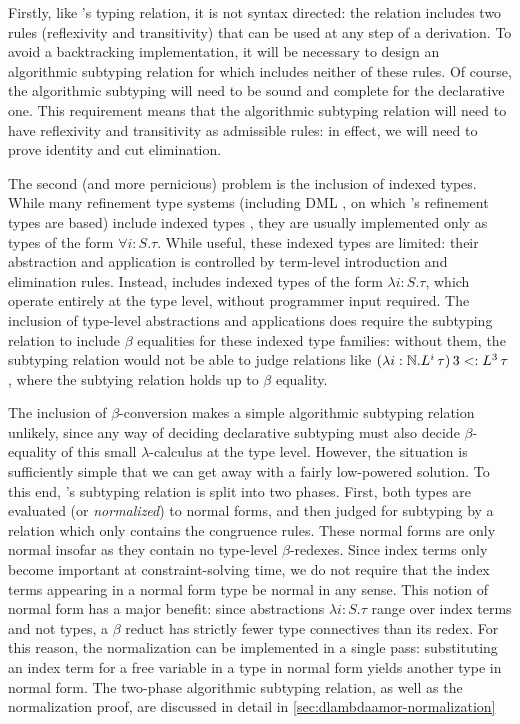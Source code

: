 Firstly, like \dlambdaamor's typing relation, it is not syntax directed: the relation includes two rules (reflexivity and transitivity) that can be used at any step of a derivation. To avoid a backtracking implementation, it will be necessary to design an algorithmic subtyping relation for \bilambdaamor which includes neither of these rules. Of course, the algorithmic subtyping will need to be sound and complete for the declarative one. This requirement means that the algorithmic subtyping relation will need to have reflexivity and transitivity as admissible rules: in effect, we will need to prove identity and cut elimination.

The second (and more pernicious) problem is the inclusion of indexed types. While many refinement type systems (including DML \cite{xi:jfp07}, on which \lambdaamor's refinement types are based) include indexed types \cite{zenger:tcs97}, they are usually implemented only as types of the form $\forall i : S. \tau$. While useful, these indexed types are limited: their abstraction and application is controlled by term-level introduction and elimination rules. Instead, \dlambdaamor includes indexed types of the form $\lambda i : S. \tau$, which operate entirely at the type level, without programmer input required. The inclusion of type-level abstractions and applications does require the subtyping relation to include $\beta$ equalities for these indexed type families: without them, the subtyping relation would not be able to judge relations like $(\lambda i : \mathbb{N}. L^i\, \tau) \, 3 <: L^3 \, \tau$, where the subtying relation holds up to $\beta$ equality.

The inclusion of $\beta$-conversion makes a simple algorithmic subtyping relation unlikely, since any way of deciding declarative subtyping must also decide $\beta$-equality of this small $\lambda$-calculus at the type level. However, the situation is sufficiently simple that we can get away with a fairly low-powered solution. To this end, \bilambdaamor's subtyping relation is split into two phases. First, both types are evaluated (or \textit{normalized}) to normal forms, and then judged for subtyping by a relation which only contains the congruence rules. These normal forms are only normal insofar as they contain no type-level $\beta$-redexes. Since index terms only become important at constraint-solving time, we do not require that the index terms appearing in a normal form type be normal in any sense. This notion of normal form has a major benefit: since abstractions $\lambda i : S.\tau$ range over index terms and not types, a $\beta$ reduct has strictly fewer type connectives than its redex. For this reason, the normalization can be implemented in a single pass: substituting an index term for a free variable in a type in normal form yields another type in normal form. The two-phase algorithmic subtyping relation, as well as the normalization proof, are discussed in detail in \autoref{sec:dlambdaamor-normalization}

